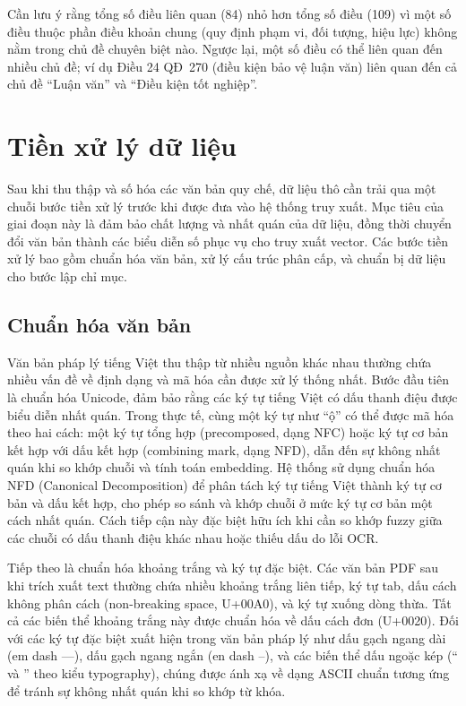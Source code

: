 Cần lưu ý rằng tổng số điều liên quan (84) nhỏ hơn tổng số điều (109) vì một số
điều thuộc phần điều khoản chung (quy định phạm vi, đối tượng, hiệu lực) không
nằm trong chủ đề chuyên biệt nào. Ngược lại, một số điều có thể liên quan đến
nhiều chủ đề; ví dụ Điều 24 QĐ~270 (điều kiện bảo vệ luận văn) liên quan đến cả
chủ đề ``Luận văn'' và ``Điều kiện tốt nghiệp''.

\section{Tiền xử lý dữ liệu}
\label{sec:tien-xu-ly-du-lieu}

Sau khi thu thập và số hóa các văn bản quy chế, dữ liệu thô cần trải qua một
chuỗi bước tiền xử lý trước khi được đưa vào hệ thống truy xuất. Mục tiêu của
giai đoạn này là đảm bảo chất lượng và nhất quán của dữ liệu, đồng thời chuyển
đổi văn bản thành các biểu diễn số phục vụ cho truy xuất vector. Các bước tiền
xử lý bao gồm chuẩn hóa văn bản, xử lý cấu trúc phân cấp, và chuẩn bị dữ liệu
cho bước lập chỉ mục.

\subsection{Chuẩn hóa văn bản}
\label{subsec:chuan-hoa-van-ban}

Văn bản pháp lý tiếng Việt thu thập từ nhiều nguồn khác nhau thường chứa nhiều
vấn đề về định dạng và mã hóa cần được xử lý thống nhất. Bước đầu tiên là chuẩn
hóa Unicode, đảm bảo rằng các ký tự tiếng Việt có dấu thanh điệu được biểu diễn
nhất quán. Trong thực tế, cùng một ký tự như ``ộ'' có thể được mã hóa theo hai
cách: một ký tự tổng hợp (precomposed, dạng NFC) hoặc ký tự cơ bản kết hợp với
dấu kết hợp (combining mark, dạng NFD), dẫn đến sự không nhất quán khi so khớp
chuỗi và tính toán embedding. Hệ thống sử dụng chuẩn hóa NFD (Canonical
Decomposition) để phân tách ký tự tiếng Việt thành ký tự cơ bản và dấu kết hợp,
cho phép so sánh và khớp chuỗi ở mức ký tự cơ bản một cách nhất quán. Cách tiếp
cận này đặc biệt hữu ích khi cần so khớp fuzzy giữa các chuỗi có dấu thanh điệu
khác nhau hoặc thiếu dấu do lỗi OCR.

Tiếp theo là chuẩn hóa khoảng trắng và ký tự đặc biệt. Các văn bản PDF sau khi
trích xuất text thường chứa nhiều khoảng trắng liên tiếp, ký tự tab, dấu cách
không phân cách (non-breaking space, U+00A0), và ký tự xuống dòng thừa. Tất cả
các biến thể khoảng trắng này được chuẩn hóa về dấu cách đơn (U+0020). Đối với
các ký tự đặc biệt xuất hiện trong văn bản pháp lý như dấu gạch ngang dài (em
dash ---), dấu gạch ngang ngắn (en dash --), và các biến thể dấu ngoặc kép (``
và '' theo kiểu typography), chúng được ánh xạ về dạng ASCII chuẩn tương ứng để
tránh sự không nhất quán khi so khớp từ khóa.

